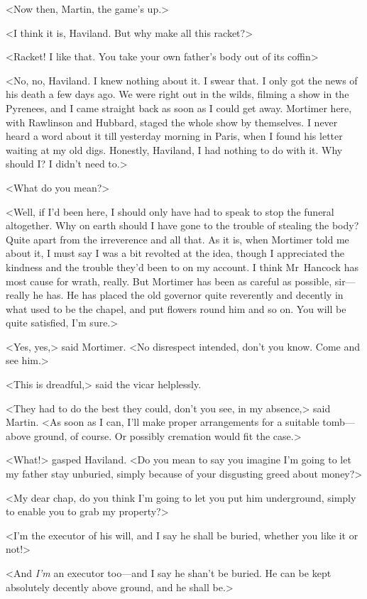 <Now then, Martin, the game's up.>

<I think it is, Haviland. But why make all this racket?>

<Racket! I like that. You take your own father's body out of its coffin\longdash>

<No, no, Haviland. I knew nothing about it. I swear that. I only got the news of his death a few days ago. We were right out in the wilds, filming a show in the Pyrenees, and I came straight back as soon as I could get away. Mortimer here, with Rawlinson and Hubbard, staged the whole show by themselves. I never heard a word about it till yesterday morning in Paris, when I found his letter waiting at my old digs. Honestly, Haviland, I had nothing to do with it. Why should I\@? I didn't need to.>

<What do you mean?>

<Well, if I'd been here, I should only have had to speak to stop the funeral altogether. Why on earth should I have gone to the trouble of stealing the body? Quite apart from the irreverence and all that. As it is, when Mortimer told me about it, I must say I was a bit revolted at the idea, though I appreciated the kindness and the trouble they'd been to on my account. I think Mr~Hancock has most cause for wrath, really. But Mortimer has been as careful as possible, sir—really he has. He has placed the old governor quite reverently and decently in what used to be the chapel, and put flowers round him and so on. You will be quite satisfied, I'm sure.>

<Yes, yes,> said Mortimer. <No disrespect intended, don't you know. Come and see him.>

<This is dreadful,> said the vicar helplessly.

<They had to do the best they could, don't you see, in my absence,> said Martin. <As soon as I can, I'll make proper arrangements for a suitable tomb—above ground, of course. Or possibly cremation would fit the case.>

<What!> gasped Haviland. <Do you mean to say you imagine I'm going to let my father stay unburied, simply because of your disgusting greed about money?>

<My dear chap, do you think I'm going to let you put him underground, simply to enable you to grab my property?>

<I'm the executor of his will, and I say he shall be buried, whether you like it or not!>

<And \textit{I'm} an executor too—and I say he shan't be buried. He can be kept absolutely decently above ground, and he shall be.>

